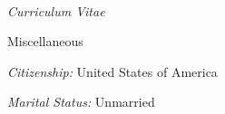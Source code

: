 \documentclass[10pt]{article}
\begin{document}
\begin{cv}{\name\\{\large \itshape Curriculum Vitae}}
\setlength{\oldcvlabelwidth}{\cvlabelwidth}
\setlength{\cvlabelwidth}{1em}
\begin{cvlist}{Miscellaneous}
\item \textit{Citizenship:} United States of America
\item \textit{Marital Status:} Unmarried
\end{cvlist}

\setlength{\cvlabelwidth}{\oldcvlabelwidth}

\end{cv}
\end{document}
